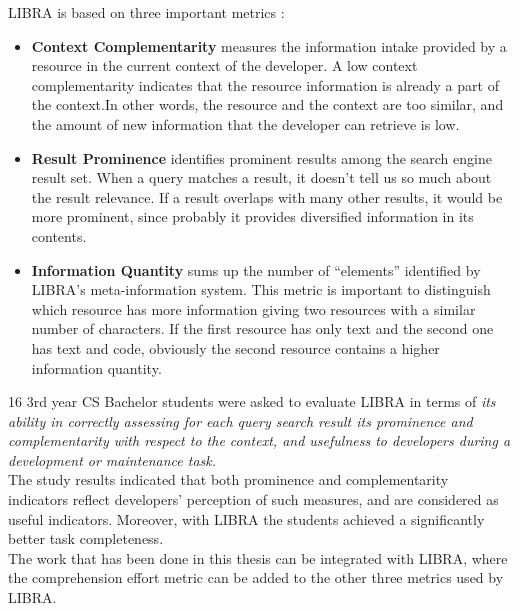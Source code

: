 \documentclass[12pt,mscthesis]{usiinfthesis}
\begin{document}
	LIBRA is based on three important metrics :
	
	\begin{itemize}
	\item \textbf{Context Complementarity} measures the information intake provided by a resource in the current context of the developer. A low context complementarity indicates that the resource information is already a part of the context.In other words, the resource and the context are too similar, and the amount of new information that the developer can retrieve is low.
	
	\item \textbf{Result Prominence} identifies prominent results among the search engine result set. When a query matches a result, it doesn't tell us so much about the result relevance. If a result overlaps with many other results, it would be more prominent, since probably it provides diversified information in its contents.
	
	\item \textbf{Information Quantity} sums up the number of ``elements'' identified by LIBRA's meta-information system. This metric is important to distinguish which resource has more information giving two resources with a similar number of characters. If the first resource has only text and the second one has text and code, obviously the second resource contains a higher information quantity.
	\end{itemize}

	16 3rd year CS Bachelor students were asked to evaluate LIBRA in terms of \textit{its ability in correctly assessing for each query search result its prominence and complementarity with respect to the context, and usefulness to developers during a development or maintenance task.}\\
	The study results indicated that both prominence and complementarity indicators reflect developers’ perception of such measures, and are considered as useful indicators. Moreover, with LIBRA the students  achieved a significantly better task completeness.\\

	The work that has been done in this thesis can be integrated with LIBRA, where the comprehension effort metric can be added to the other three metrics used by LIBRA.
\end{document}
